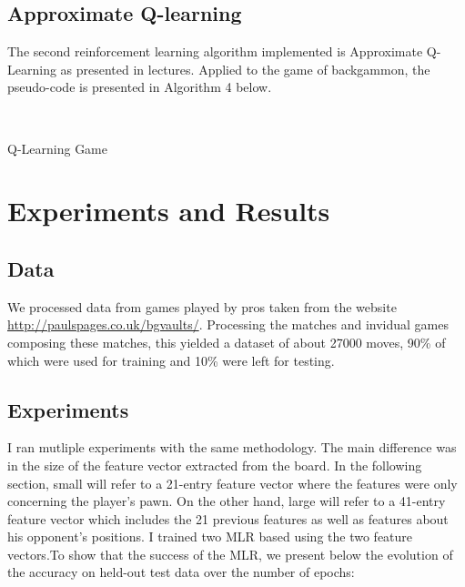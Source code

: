 \documentclass[11pt]{article}
\begin{document}
\subsection{Approximate Q-learning}
The second reinforcement learning algorithm implemented is Approximate Q-Learning as presented in lectures. Applied to the game of backgammon, the pseudo-code is presented in Algorithm 4 below.
\begin{algorithm}
	\begin{algorithmic}
		\EndWhile{}
		
	\EndProcedure{}
	\\
	
	\EndWhile{}
	\EndProcedure{}
	\end{algorithmic}
	\caption{Q-Learning Game}
\end{algorithm}
\section{Experiments and Results}
\subsection{Data}
We processed data from games played by pros taken from the website \underline{http://paulspages.co.uk/bgvaults/}. Processing the matches and invidual games composing these matches, this yielded a dataset of about 27000 moves, 90\% of which were used for training and 10\% were left for testing.\\

\subsection{Experiments}
I ran mutliple experiments with the same methodology. The main difference was in the size of the feature vector extracted from the board. In the following section, small will refer to a 21-entry feature vector where the features were only concerning the player's pawn. On the other hand, large will refer to a 41-entry feature vector which includes the 21 previous features as well as features about his opponent's positions. I trained two MLR based using the two feature vectors.To show that the success of the MLR, we present below the evolution of the accuracy on held-out test data over the number of epochs:
\end{document}

